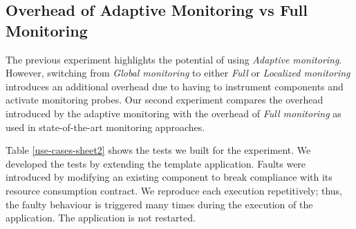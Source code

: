 
\subsection{Overhead of Adaptive Monitoring vs Full Monitoring\label{sec:adaptive-vs-full}}
The previous experiment highlights the potential of using \emph{Adaptive monitoring}. However, switching from \emph{Global monitoring} to either \emph{Full} or \emph{Localized monitoring} introduces an additional overhead due to having to instrument components and activate monitoring probes.
Our second experiment compares the overhead introduced by the adaptive monitoring with the overhead of \emph{Full monitoring} as used in state-of-the-art monitoring approaches. 

Table \ref{use-cases-sheet2} shows the tests we built for the experiment.
We developed the tests by extending the template application. Faults were introduced by modifying an existing component to break compliance with its resource consumption contract.
We reproduce each execution repetitively; thus, the faulty behaviour is triggered many times during the execution of the application. The application is not restarted.

